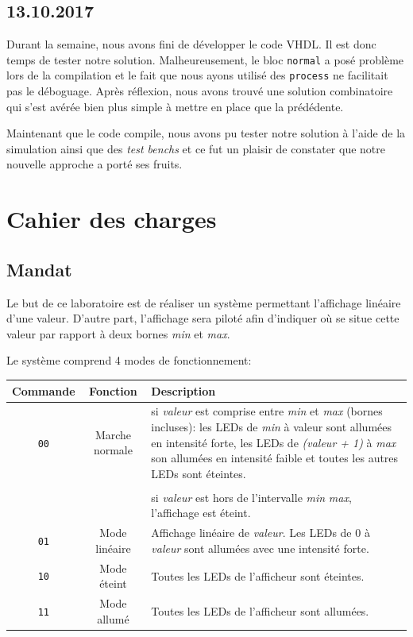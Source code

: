 \subsection*{13.10.2017}

Durant la semaine, nous avons fini de développer le code VHDL. Il est donc temps de tester notre solution. Malheureusement, le bloc \texttt{normal} a posé problème lors de la compilation et le fait que nous ayons utilisé des \lstinline{process} ne facilitait pas le déboguage. Après réflexion, nous avons trouvé une solution combinatoire qui s'est avérée bien plus simple à mettre en place que la prédédente.

Maintenant que le code compile, nous avons pu tester notre solution à l'aide de la simulation ainsi que des \textit{test benchs} et ce fut un plaisir de constater que notre nouvelle approche a porté ses fruits.

\section{Cahier des charges}

\subsection{Mandat}

Le but de ce laboratoire est de réaliser un système permettant l'affichage linéaire d'une valeur.
D'autre part, l'affichage sera piloté afin d'indiquer où se situe cette valeur par rapport à deux bornes \textit{min} et \textit{max}.

Le système comprend 4 modes de fonctionnement: \\

\begin{tabulary}{\textwidth}{|c|c|L|}
	\hline
	\textbf{Commande} & \textbf{Fonction} & \textbf{Description} \\
	\hline
	\texttt{00} & Marche normale & si \textit{valeur} est comprise entre \textit{min} et \textit{max} (bornes incluses): les LEDs de \textit{min} à valeur sont allumées en intensité forte, les LEDs de \textit{(valeur + 1)} à \textit{max} son allumées en intensité faible et toutes les autres LEDs sont éteintes. \\ & & \\
	& & si \textit{valeur} est hors de l'intervalle \textit{min} \textit{max}, l'affichage est éteint. \\
	\hline
	\texttt{01} & Mode linéaire & Affichage linéaire de \textit{valeur}. Les LEDs de 0 à \textit{valeur} sont allumées avec une intensité forte. \\
	\hline
	\texttt{10} & Mode éteint & Toutes les LEDs de l'afficheur sont éteintes. \\
	\hline
	\texttt{11} & Mode allumé & Toutes les LEDs de l'afficheur sont allumées. \\
	\hline
\end{tabulary}

